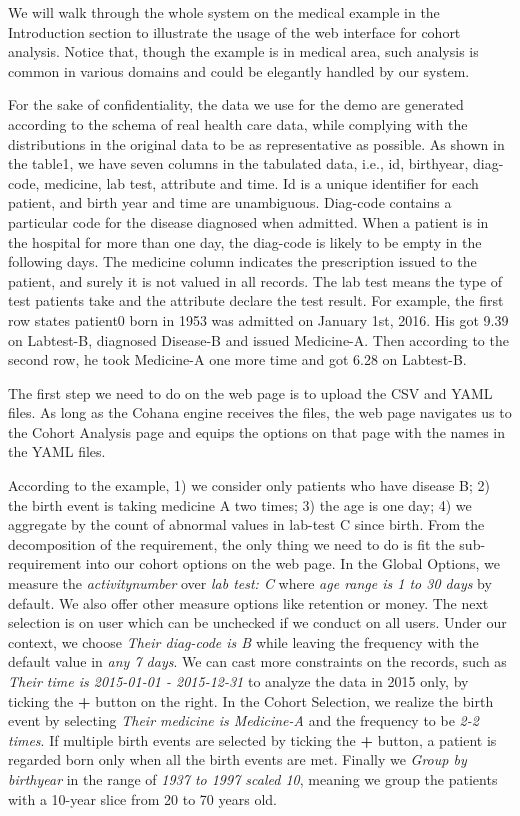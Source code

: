 \documentclass[10pt,conference,letterpaper]{IEEEtran}
\begin{document}
We will walk through the whole system on the medical example in the Introduction section to illustrate the usage of the web interface for cohort analysis. Notice that, though the example is in medical area, such analysis is common in various domains and could be elegantly handled by our system.

For the sake of confidentiality, the data we use for the demo are generated according to the schema of real health care data, while complying with the distributions in the original data to be as representative as possible. As shown in the table1, we have seven columns in the tabulated data, i.e., id, birthyear, diag-code, medicine, lab test, attribute and time. Id is a unique identifier for each patient, and birth year and time are unambiguous. Diag-code contains a particular code for the disease diagnosed when admitted. When a patient is in the hospital for more than one day, the diag-code is likely to be empty in the following days. The medicine column indicates the prescription issued to the patient, and surely it is not valued in all records. The lab test means the type of test patients take and the attribute declare the test result. For example, the first row states patient0 born in 1953 was admitted on January 1st, 2016. His got 9.39 on Labtest-B, diagnosed Disease-B and issued Medicine-A. Then according to the second row, he took Medicine-A one more time and got 6.28 on Labtest-B.

The first step we need to do on the web page is to upload the CSV and YAML files. As long as the Cohana engine receives the files, the web page navigates us to the Cohort Analysis page and equips the options on that page with the names in the YAML files.

According to the example, 1) we consider only patients who have disease B; 2) the birth event is taking medicine A two times; 3) the age is one day; 4) we aggregate by the count of abnormal values in lab-test C since birth. From the decomposition of the requirement, the only thing we need to do is fit the sub-requirement into our cohort options on the web page. In the Global Options, we measure the \emph{activity\textunderscore number} over \emph{lab test: C} where \emph{age range is 1 to 30 days} by default. We also offer other measure options like retention or money. The next selection is on user which can be unchecked if we conduct on all users. Under our context, we choose \emph{Their diag-code is B} while leaving the frequency with the default value in \emph{any 7 days}. We can cast more constraints on the records, such as \emph{Their time is 2015-01-01 - 2015-12-31} to analyze the data in 2015 only, by ticking the \textbf{+} button on the right. In the Cohort Selection, we realize the birth event by selecting \emph{Their medicine is Medicine-A} and the frequency to be \emph{2-2 times}. If multiple birth events are selected by ticking the \textbf{+} button, a patient is regarded born only when all the birth events are met. Finally we \emph{Group by birthyear} in the range of \emph{1937 to 1997 scaled 10}, meaning we group the patients with a 10-year slice from 20 to 70 years old.
\end{document}

